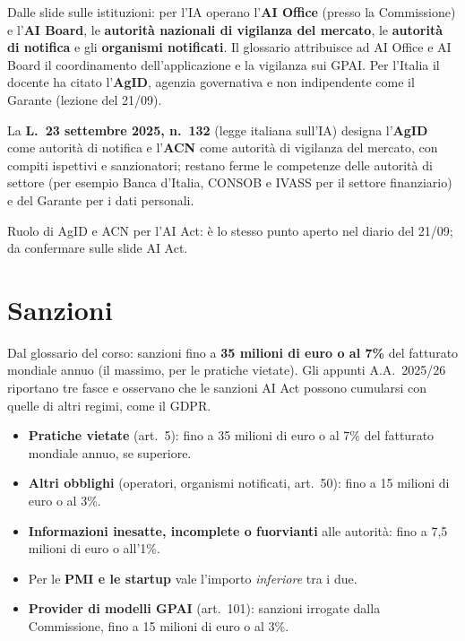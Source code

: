 Dalle slide sulle istituzioni: per l'IA operano l'\textbf{AI Office} (presso la Commissione) e
l'\textbf{AI Board}, le \textbf{autorità nazionali di vigilanza del mercato}, le \textbf{autorità di
notifica} e gli \textbf{organismi notificati}. Il glossario attribuisce ad AI Office e AI Board il
coordinamento dell'applicazione e la vigilanza sui GPAI. Per l'Italia il docente ha citato
l'\textbf{AgID}, agenzia governativa e non indipendente come il Garante (lezione del 21/09).

\begin{integrazione}
La \textbf{L.~23 settembre 2025, n.~132} (legge italiana sull'IA) designa l'\textbf{AgID} come autorità
di notifica e l'\textbf{ACN} come autorità di vigilanza del mercato, con compiti ispettivi e
sanzionatori; restano ferme le competenze delle autorità di settore (per esempio Banca d'Italia, CONSOB
e IVASS per il settore finanziario) e del Garante per i dati personali.
\end{integrazione}

\begin{verifica}
Ruolo di AgID e ACN per l'AI Act: è lo stesso punto aperto nel diario del 21/09; da confermare sulle slide
AI Act.
\end{verifica}

\section{Sanzioni}
\label{sec:aiact-sanzioni}

Dal glossario del corso: sanzioni fino a \textbf{35 milioni di euro o al 7\%} del fatturato mondiale
annuo (il massimo, per le pratiche vietate). Gli appunti A.A.~2025/26 riportano tre fasce e osservano che
le sanzioni AI Act possono cumularsi con quelle di altri regimi, come il GDPR.

\begin{integrazione}
\begin{itemize}
  \item \textbf{Pratiche vietate} (art.~5): fino a 35 milioni di euro o al 7\% del fatturato mondiale
    annuo, se superiore.
  \item \textbf{Altri obblighi} (operatori, organismi notificati, art.~50): fino a 15 milioni di euro o
    al 3\%.
  \item \textbf{Informazioni inesatte, incomplete o fuorvianti} alle autorità: fino a 7,5 milioni di
    euro o all'1\%.
  \item Per le \textbf{PMI e le startup} vale l'importo \emph{inferiore} tra i due.
  \item \textbf{Provider di modelli GPAI} (art.~101): sanzioni irrogate dalla Commissione, fino a
    15 milioni di euro o al 3\%.
\end{itemize}
\end{integrazione}

